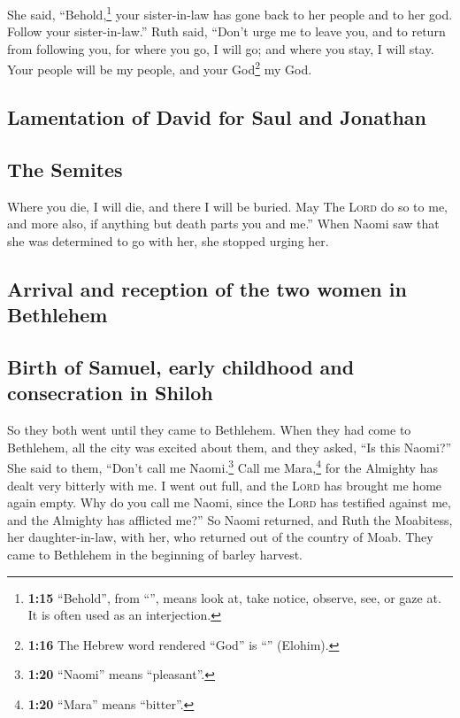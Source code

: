  She said, ``Behold,\footnote{\textbf{1:15} ``Behold'',
  from ``'', means look at, take notice, observe, see, or
  gaze at. It is often used as an interjection.} your sister-in-law has
gone back to her people and to her god. Follow your sister-in-law.''
 Ruth said, ``Don't urge me to leave you, and to return
from following you, for where you go, I will go; and where you stay, I
will stay. Your people will be my people, and your God\footnote{\textbf{1:16}
  The Hebrew word rendered ``God'' is ``'' (Elohim).} my
God.

\hypertarget{lamentation-of-david-for-saul-and-jonathan}{%
\subsection{Lamentation of David for Saul and
Jonathan}\label{lamentation-of-david-for-saul-and-jonathan}}

\hypertarget{the-semites}{%
\subsection{The Semites}\label{the-semites}}

 Where you die, I will die, and there I will be buried.
May The \textsc{Lord} do so to me, and more also, if anything but death
parts you and me.''  When Naomi saw that she was
determined to go with her, she stopped urging her.

\hypertarget{arrival-and-reception-of-the-two-women-in-bethlehem}{%
\subsection{Arrival and reception of the two women in
Bethlehem}\label{arrival-and-reception-of-the-two-women-in-bethlehem}}

\hypertarget{birth-of-samuel-early-childhood-and-consecration-in-shiloh}{%
\subsection{Birth of Samuel, early childhood and consecration in
Shiloh}\label{birth-of-samuel-early-childhood-and-consecration-in-shiloh}}

 So they both went until they came to Bethlehem. When
they had come to Bethlehem, all the city was excited about them, and
they asked, ``Is this Naomi?''  She said to them, ``Don't
call me Naomi.\footnote{\textbf{1:20} ``Naomi'' means ``pleasant''.}
Call me Mara,\footnote{\textbf{1:20} ``Mara'' means ``bitter''.} for the
Almighty has dealt very bitterly with me.  I went out
full, and the \textsc{Lord} has brought me home again empty. Why do you
call me Naomi, since the \textsc{Lord} has testified against me, and the
Almighty has afflicted me?''  So Naomi returned, and Ruth
the Moabitess, her daughter-in-law, with her, who returned out of the
country of Moab. They came to Bethlehem in the beginning of barley
harvest.

